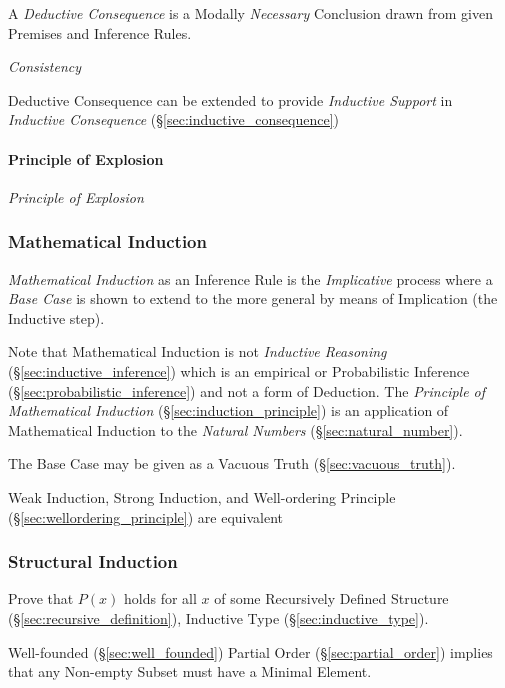 A \emph{Deductive Consequence} is a Modally \emph{Necessary}
Conclusion drawn from given Premises and Inference Rules.

\emph{Consistency}

Deductive Consequence can be extended to provide \emph{Inductive
  Support} in \emph{Inductive Consequence}
(\S\ref{sec:inductive_consequence})



\paragraph{Principle of Explosion}\label{sec:explosion_principle}\hfill

\emph{Principle of Explosion}



\subsubsection{Mathematical Induction}\label{sec:mathematical_induction}

\emph{Mathematical Induction} as an Inference Rule is the
\emph{Implicative} process where a \emph{Base Case} is shown to extend
to the more general by means of Implication (the Inductive step).

Note that Mathematical Induction is not \emph{Inductive Reasoning}
(\S\ref{sec:inductive_inference}) which is an empirical or
Probabilistic Inference (\S\ref{sec:probabilistic_inference}) and not
a form of Deduction. The \emph{Principle of Mathematical Induction}
(\S\ref{sec:induction_principle}) is an application of Mathematical
Induction to the \emph{Natural Numbers} (\S\ref{sec:natural_number}).

The Base Case may be given as a Vacuous Truth
(\S\ref{sec:vacuous_truth}).

Weak Induction, Strong Induction, and Well-ordering Principle
(\S\ref{sec:wellordering_principle}) are equivalent



\subsubsection{Structural Induction}\label{sec:structural_induction}

Prove that $P(x)$ holds for all $x$ of some Recursively Defined
Structure (\S\ref{sec:recursive_definition}), Inductive Type
(\S\ref{sec:inductive_type}).

Well-founded (\S\ref{sec:well_founded}) Partial Order
(\S\ref{sec:partial_order}) implies that any Non-empty Subset must
have a Minimal Element.

